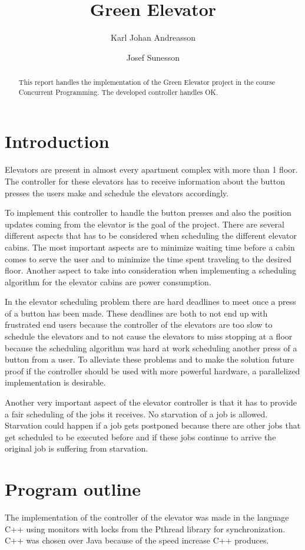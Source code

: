 \documentclass[10pt,a4paper]{article}
\author{Karl Johan Andreasson \and Josef Sunesson}
\title{Green Elevator}
\begin{document}
\maketitle

\begin{abstract} 
This report handles the implementation of the Green Elevator project in the course Concurrent Programming. The developed controller handles OK.
\end{abstract}

\section{Introduction}
\label{sec:intro}
Elevators are present in almost every apartment complex with more than 1 floor. The controller for these elevators has to receive information about the button presses the users make and schedule the elevators accordingly.

To implement this controller to handle the button presses and also the position updates coming from the elevator is the goal of the project. There are several different aspects that has to be considered when scheduling the different elevator cabins. The most important aspects are to minimize waiting time before a cabin comes to serve the user and to minimize the time spent traveling to the desired floor. Another aspect to take into consideration when implementing a scheduling algorithm for the elevator cabins are power consumption.

In the elevator scheduling problem there are hard deadlines to meet once a press of a button has been made. These deadlines are both to not end up with frustrated end users because the controller of the elevators are too slow to schedule the elevators and to not cause the elevators to miss stopping at a floor because the scheduling algorithm was hard at work scheduling another press of a button from a user. To alleviate these problems and to make the solution future proof if the controller should be used with more powerful hardware, a parallelized implementation is desirable.

Another very important aspect of the elevator controller is that it has to provide a fair scheduling of the jobs it receives. No starvation of a job is allowed. Starvation could happen if a job gets postponed because there are other jobs that get scheduled to be executed before and if these jobs continue to arrive the original job is suffering from starvation.

\section{Program outline}
The implementation of the controller of the elevator was made in the language C++ using monitors with locks from the Pthread library for synchronization. C++ was chosen over Java because of the speed increase C++ produces.
\end{document}
